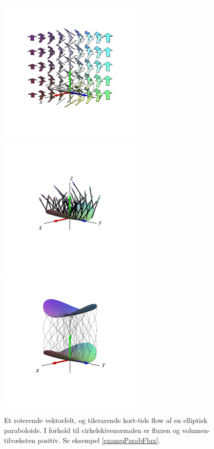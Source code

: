 \begin{figure}[ht]
\centerline{\includegraphics[width=70mm]{FIGS/plotParabFlowA1}\includegraphics[width=70mm]{FIGS/plotParabFlowA3}\includegraphics[width=70mm]{FIGS/plotParabFlowA2}}
\begin{center}
\caption{\small{Et roterende vektorfelt, og tilsvarende kort-tids flow af en elliptisk paraboloide. I forhold til cirkelskivenormalen er fluxen og volumen-tilvæksten positiv. Se eksempel \ref{exampParabFlux}.}} \label{figParabFlow}
\end{center}
\end{figure}



